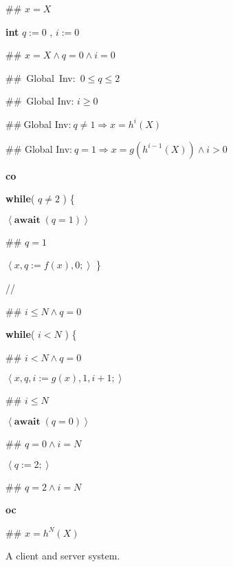 \documentclass[muchmore,11pt]{article}%
\begin{document}
\begin{figure}[tb!]%


\begin{code}
\#\# $x=X$

\textbf{int} $q:=0$ , $i:=0$

\#\# $x=X\wedge q=0\wedge i=0$

\#\#\ Global\ Inv:\ $0\leq q\leq2$

\#\#\ Global Inv: $i\geq0$

\#\#$\ $Global Inv:$\ q\neq1\Rightarrow x=h^{i}(X)$

\#\# Global Inv:$\ q=1\Rightarrow x=g(h^{i-1}(X))\wedge i>0$

\textbf{co}

\begin{indent}
\item \textbf{while}( $q\neq2$ ) \{

\begin{indent}
\item $\left\langle \mathbf{await\;}(q=1)\right\rangle $

\item \#\# $q=1$

\item $\left\langle x,q:=f(x),0;\right\rangle $ \}
\end{indent}
\end{indent}

//

\begin{indent}
\item \#\# $i\leq N\wedge q=0$

\item \textbf{while}( $i<N$ ) \{

\begin{indent}
\item \#\# $i<N\wedge q=0$

\item $\left\langle x,q,i:=g(x),1,i+1;\right\rangle $

\item \#\# $i\leq N$

\item $\left\langle \mathbf{await\;}(q=0)\right\rangle $
\end{indent}

\item \#\# $q=0\wedge i=N$

\item $\left\langle q:=2;\right\rangle $

\item \#\# $q=2\wedge i=N$
\end{indent}

\textbf{oc}

\#\# $x=h^{N}(X)$
\end{code}

%

\caption{A client and server system.}\label{cs}\end{figure}%
\end{document}
